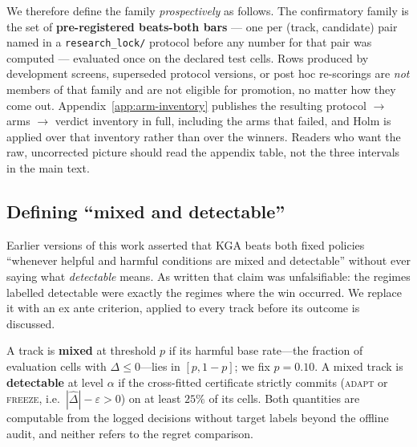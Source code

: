 We therefore define the family \emph{prospectively} as follows. The confirmatory family is the set
of \textbf{pre-registered beats-both bars} --- one per (track, candidate) pair named in a
\texttt{research\_lock/} protocol before any number for that pair was computed --- evaluated once on
the declared test cells. Rows produced by development screens, superseded protocol versions, or
post hoc re-scorings are \emph{not} members of that family and are not eligible for promotion, no
matter how they come out. Appendix~\ref{app:arm-inventory} publishes the resulting protocol $\to$
arms $\to$ verdict inventory in full, including the arms that failed, and Holm is applied over that
inventory rather than over the winners. Readers who want the raw, uncorrected picture should read
the appendix table, not the three intervals in the main text.

\subsection{Defining ``mixed and detectable''}\label{sec:detectability}
Earlier versions of this work asserted that \textsc{KGA} beats both fixed policies ``whenever
helpful and harmful conditions are mixed and detectable'' without ever saying what \emph{detectable}
means. As written that claim was unfalsifiable: the regimes labelled detectable were exactly the
regimes where the win occurred. We replace it with an ex ante criterion, applied to every track
before its outcome is discussed.

\begin{definition}\label{def:detectable}
A track is \textbf{mixed} at threshold $p$ if its harmful base rate---the fraction of evaluation
cells with $\Delta\le0$---lies in $[p,1-p]$; we fix $p=0.10$. A mixed track is \textbf{detectable}
at level $\alpha$ if the cross-fitted certificate strictly commits (\textsc{adapt} or
\textsc{freeze}, i.e.\ $|\widehat\Delta|-\varepsilon>0$) on at least $25\%$ of its cells. Both
quantities are computable from the logged decisions without target labels beyond the offline audit,
and neither refers to the regret comparison.
\end{definition}

